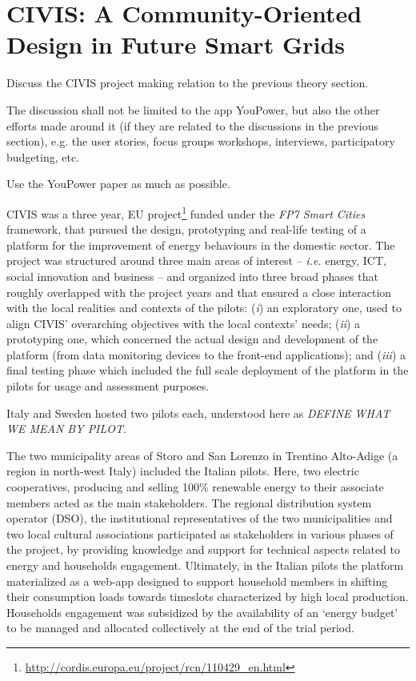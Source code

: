 \section{CIVIS: A Community-Oriented Design in Future Smart Grids}

\begin{svgraybox}
Discuss the CIVIS project making relation to the previous theory section. 

The discussion shall not be limited to the app YouPower, but also the other efforts made around it (if they are related to the discussions in the previous section), e.g. the user stories, focus groups workshops, interviews, participatory budgeting, etc. 

Use the YouPower paper as much as possible. 
\end{svgraybox}

CIVIS was a three year, EU project\footnote{\url{http://cordis.europa.eu/project/rcn/110429\_en.html}} funded under the \textit{FP7 Smart Cities} framework, that pursued the design,
prototyping and real-life testing of a platform for the improvement of energy behaviours in the domestic sector. The project was structured around three main areas
of interest – \textit{i.e.} energy, ICT, social innovation and business – and organized into three broad phases that roughly
overlapped with the project years and that ensured a close interaction with the local realities and contexts of
the pilots: (\textit{i}) an exploratory one, used to align CIVIS’ overarching objectives with the local contexts’ needs;
(\textit{ii}) a prototyping one, which concerned the actual design and development of the platform (from data monitoring devices to the
front-end applications); and (\textit{iii}) a final testing phase which included the full scale deployment of the platform in the pilots for usage and assessment purposes.

Italy and Sweden hosted two pilots each, understood here as \textit{DEFINE WHAT WE MEAN BY PILOT}.

The two municipality areas of Storo and San Lorenzo in Trentino Alto-Adige (a region in north-west Italy) included the
Italian pilots. Here, two electric cooperatives, producing and selling 100\% renewable energy
to their associate members acted as the main stakeholders. The regional distribution system operator (DSO),
the institutional representatives of the two municipalities and two local cultural associations participated as
stakeholders in various phases of the project, by providing knowledge and support for technical aspects related
to energy and households engagement. Ultimately, in the Italian pilots the platform materialized as a web-app
designed to support household members in shifting their consumption loads towards timeslots characterized by high
local production. Households engagement was subsidized by the availability of an `energy budget' to be managed
and allocated collectively at the end of the trial period.

